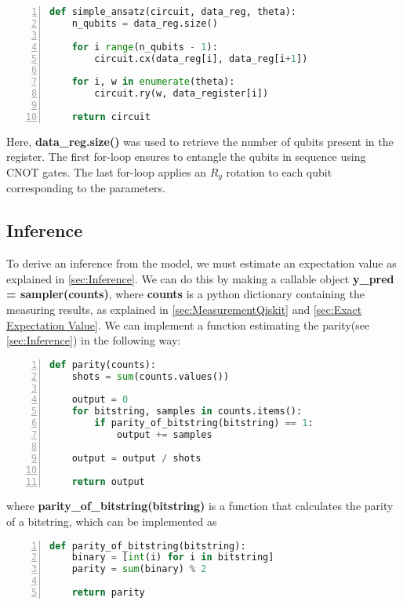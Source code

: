 \begin{lstlisting}[language=python, numbers=left]
def simple_ansatz(circuit, data_reg, theta):
    n_qubits = data_reg.size()
    
    for i range(n_qubits - 1):
        circuit.cx(data_reg[i], data_reg[i+1])
    
    for i, w in enumerate(theta):
        circuit.ry(w, data_register[i])
        
    return circuit
\end{lstlisting}
Here, \textbf{data\_reg.size()} was used to retrieve the number of qubits present in the register. The first for-loop ensures to entangle the qubits in sequence using CNOT gates. The last for-loop applies an $R_y$ rotation to each qubit corresponding to the parameters.

\subsection{Inference}\label{sec:InferenceImplementation}
To derive an inference from the model, we must estimate an expectation value as explained in \autoref{sec:Inference}. We can do this by making a callable object \textbf{y\_pred = sampler(counts)}, where \textbf{counts} is a python dictionary containing the measuring results, as explained in \autoref{sec:MeasurementQiskit} and \autoref{sec:Exact Expectation Value}. We can implement a function estimating the parity(see \autoref{sec:Inference}) in the following way:

\begin{lstlisting}[language=python, numbers=left]
def parity(counts):
    shots = sum(counts.values())
    
    output = 0
    for bitstring, samples in counts.items():
        if parity_of_bitstring(bitstring) == 1:
            output += samples

    output = output / shots

    return output
\end{lstlisting}
where \textbf{parity\_of\_bitstring(bitstring)} is a function that calculates the parity of a bitstring, which can be implemented as 
\begin{lstlisting}[language=python, numbers=left]
def parity_of_bitstring(bitstring):
    binary = [int(i) for i in bitstring]
    parity = sum(binary) % 2
    
    return parity
\end{lstlisting}


